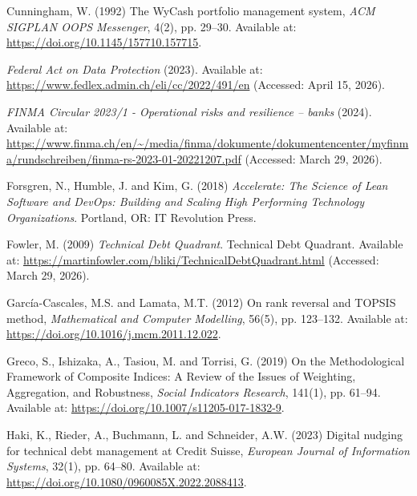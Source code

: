 \documentclass[
  12pt,
  letterpaper,
  12pt,
  oneside,
  english,
  onehalfspacing,
  headsepline]{MastersDoctoralThesis}
\newlength{\cslhangindent}
\newenvironment{CSLReferences}[2] %
 {\begin{list}{}{%
  \setlength{\itemindent}{0pt}
  \setlength{\leftmargin}{0pt}
  \setlength{\parsep}{0pt}
  \ifodd #1
   \setlength{\leftmargin}{\cslhangindent}
   \setlength{\itemindent}{-1\cslhangindent}
  \fi
  \setlength{\itemsep}{#2\baselineskip}}}
 {\end{list}}
\begin{document}
\begin{CSLReferences}{0}{1}
Cunningham, W. (1992) \textquotesingle The {WyCash} portfolio management
system\textquotesingle, \emph{ACM SIGPLAN OOPS Messenger}, 4(2), pp.
29--30. Available at: \url{https://doi.org/10.1145/157710.157715}.

\emph{Federal {Act} on {Data Protection}} (2023). Available at:
\url{https://www.fedlex.admin.ch/eli/cc/2022/491/en} (Accessed: April
15, 2026).

\emph{{FINMA Circular} 2023/1 - {Operational} risks and resilience --
banks} (2024). Available at:
\url{https://www.finma.ch/en/~/media/finma/dokumente/dokumentencenter/myfinma/rundschreiben/finma-rs-2023-01-20221207.pdf}
(Accessed: March 29, 2026).

Forsgren, N., Humble, J. and Kim, G. (2018) \emph{Accelerate: {The
Science} of {Lean Software} and {DevOps}: {Building} and {Scaling High
Performing Technology Organizations}}. Portland, OR: IT Revolution
Press.

Fowler, M. (2009) \emph{Technical {Debt Quadrant}}. Technical Debt
Quadrant. Available at:
\url{https://martinfowler.com/bliki/TechnicalDebtQuadrant.html}
(Accessed: March 29, 2026).

García-Cascales, M.S. and Lamata, M.T. (2012) \textquotesingle On rank
reversal and {TOPSIS} method\textquotesingle, \emph{Mathematical and
Computer Modelling}, 56(5), pp. 123--132. Available at:
\url{https://doi.org/10.1016/j.mcm.2011.12.022}.

Greco, S., Ishizaka, A., Tasiou, M. and Torrisi, G. (2019)
\textquotesingle On the {Methodological Framework} of {Composite
Indices}: {A Review} of the {Issues} of {Weighting}, {Aggregation}, and
{Robustness}\textquotesingle, \emph{Social Indicators Research}, 141(1),
pp. 61--94. Available at:
\url{https://doi.org/10.1007/s11205-017-1832-9}.

Haki, K., Rieder, A., Buchmann, L. and Schneider, A.W. (2023)
\textquotesingle Digital nudging for technical debt management at
{Credit Suisse}\textquotesingle, \emph{European Journal of Information
Systems}, 32(1), pp. 64--80. Available at:
\url{https://doi.org/10.1080/0960085X.2022.2088413}.


\end{CSLReferences}
\end{document}
